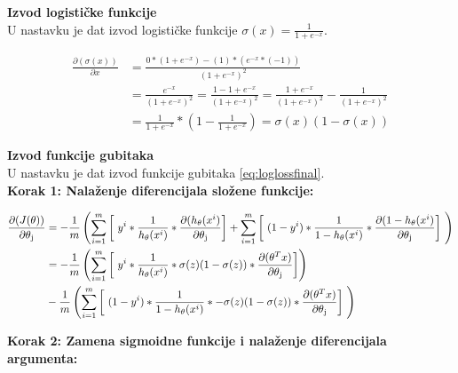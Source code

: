 \documentclass[a4paper,12pt]{report}
\begin{document}
\textbf{Izvod logističke funkcije}\\

U nastavku je dat izvod logističke funkcije $\sigma(x)  = \frac{1}{1+e^{-x}}$.

\begin{equation}
\begin{split}
	\frac{\partial (\sigma(x))}{\partial x} & = \frac{0 * (1 + e^{-x}) - (1)*(e^{-x}*(-1))}{({1+e^{-x}})^2} \\
 		& = \frac{ e^{-x}}{({1+e^{-x}})^2} = \frac{1-1 + e^{-x}}{({1+e^{-x}})^2}= \frac{ 1 + e^{-x}}{({1+e^{-x}})^2} - \frac{1}{({1+e^{-x}})^2} \\
 		& = \frac{1}{1+e^{-x}} * \left( 1 - \frac{1}{1+e^{-x}}\right) = \sigma(x)(1-\sigma(x))
\end{split}
\end{equation}

\textbf{Izvod funkcije gubitaka}\\

U nastavku je dat izvod funkcije gubitaka \ref{eq:loglossfinal}.\\

\textbf{Korak 1: Nalaženje diferencijala složene funkcije:}

\begin{equation}
\begin{split}
	\frac{\partial (J(\theta))}{\partial \theta\textsubscript{j}} & = -  \frac{1}{m} \left( \sum_{i=1}^{m} \left[\ y^i * \frac{1}{h\textsubscript {$\theta$} (x^i)}  * \frac{\partial (h\textsubscript {$\theta$}(x^i)}{\partial \theta\textsubscript{j}}\right] + \sum_{i=1}^{m} \left[\ (1 - y^i) * \frac{1}{1 - h\textsubscript {$\theta$} (x^i)}    * \frac{\partial (1 -h\textsubscript {$\theta$}(x^i)}{\partial \theta\textsubscript{j}}\right]\ \right) \\
 		& = - \frac{1}{m} \left( \sum_{i=1}^{m} \left[\ y^i * \frac{1}{h\textsubscript {$\theta$} (x^i)} * \sigma(z)(1-\sigma(z))  * \frac{\partial (\theta^T x)}{\partial \theta\textsubscript{j}} \right] \right) \\ 
 		& - \frac{1}{m} \left( \sum_{i=1}^{m} \left[\ (1 - y^i) * \frac{1}{1 - h\textsubscript {$\theta$} (x^i)} * -\sigma(z)(1-\sigma(z))  * \frac{\partial (\theta^T x)}{\partial \theta\textsubscript{j}}\right]\ \right) \\
\end{split}
\end{equation}

\textbf{Korak 2: Zamena sigmoidne funkcije i nalaženje diferencijala argumenta:} 
\end{document}
